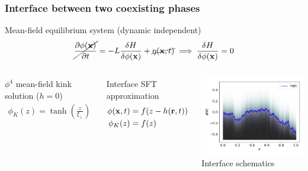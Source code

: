 \documentclass[9pt, dvipsnames]{beamer} %
\newcommand{\bx}{{\bf x}} %
\newcommand{\br}{{\bf r}}
\begin{document}
\begin{frame}
	\frametitle{Interface between two coexisting phases}
	\begin{block}{Mean-field equilibrium system (dynamic independent)}
		\begin{align}
			\cancel{\frac{\partial \phi(\bx)}{\partial t}} = - L \frac{\delta H}{\delta \phi(\bx)} + \cancel{\eta(\bx,t)}  \implies  \frac{\delta H}{\delta \phi(\bx)} = 0 
		\end{align}
	\end{block}
	\begin{columns}
    \begin{block}{$\phi^4$ mean-field kink solution ($h=0$)}
        \begin{align}
            \phi_K(z) = \tanh \left( \frac{z}{\xi_\perp} \right)
        \end{align}
    \end{block}	
	\begin{block}{Interface SFT approximation}
        \begin{align}
            \phi(\bx,t) &= f(z-h(\br,t)) \\
            \phi_K(z) &= f(z) 
        \end{align}
    \end{block}
    	\centering
		\includegraphics[width=\linewidth]{interface-profil.pdf}
		Interface schematics
	\end{columns}    
\end{frame}
\end{document}
